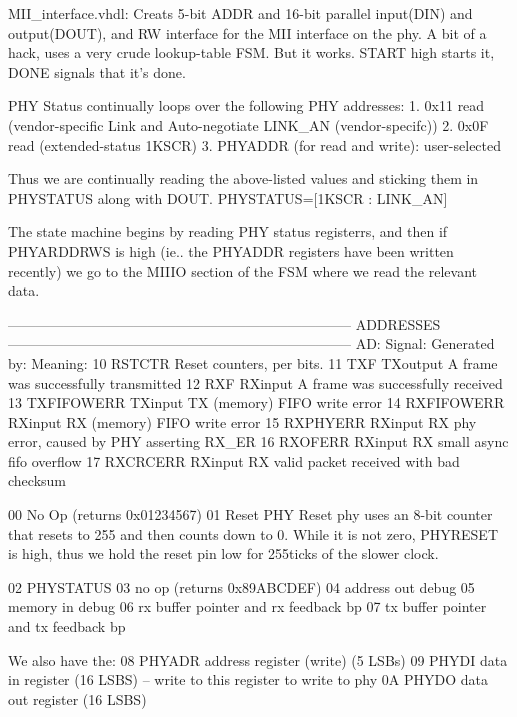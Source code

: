 MII_interface.vhdl:
Creats  5-bit ADDR and 16-bit parallel input(DIN) and output(DOUT), and RW  interface for the MII interface on the phy. A bit of a hack, uses a very crude lookup-table FSM. But it works. START high starts it, DONE signals that it's done. 

PHY Status continually loops over the following PHY addresses:
1. 0x11 read (vendor-specific Link and Auto-negotiate LINK_AN (vendor-specifc))
2. 0x0F read (extended-status 1KSCR)
3. PHYADDR (for read and write): user-selected

Thus we are continually reading the above-listed values and sticking them in PHYSTATUS along with DOUT. PHYSTATUS=[1KSCR : LINK_AN]


The state machine begins by reading PHY status registerrs, and then if PHYARDDRWS is high (ie.. the PHYADDR registers have been written recently) we go to the MIIIO section of the FSM where we read the relevant data.

--------------------------------------------------------------------------
ADDRESSES
--------------------------------------------------------------------------
AD: Signal:     Generated by:  Meaning:
10  RSTCTR                     Reset counters, per bits. 
11  TXF         TXoutput        A frame was successfully transmitted 
12  RXF         RXinput         A frame was successfully received
13  TXFIFOWERR  TXinput         TX (memory) FIFO write error
14  RXFIFOWERR  RXinput         RX (memory) FIFO write error 
15  RXPHYERR    RXinput         RX phy error, caused by PHY asserting RX_ER
16  RXOFERR     RXinput         RX small async fifo overflow
17  RXCRCERR    RXinput         RX valid packet received with bad checksum

00  No Op (returns 0x01234567)
01  Reset PHY 
    Reset phy uses an 8-bit counter that resets to 255 and then counts down to 0. While it is not zero, PHYRESET is high, thus we hold the reset pin low for 255ticks of the slower clock. 

02 PHYSTATUS 
03 no op (returns 0x89ABCDEF)
04 address out debug
05 memory in debug
06 rx buffer pointer and rx feedback bp
07 tx buffer pointer and tx feedback bp

We also have the:
08 PHYADR address register (write) (5 LSBs)
09 PHYDI data in register (16 LSBS) -- write to this register to write to phy
0A PHYDO data out register (16 LSBS)


